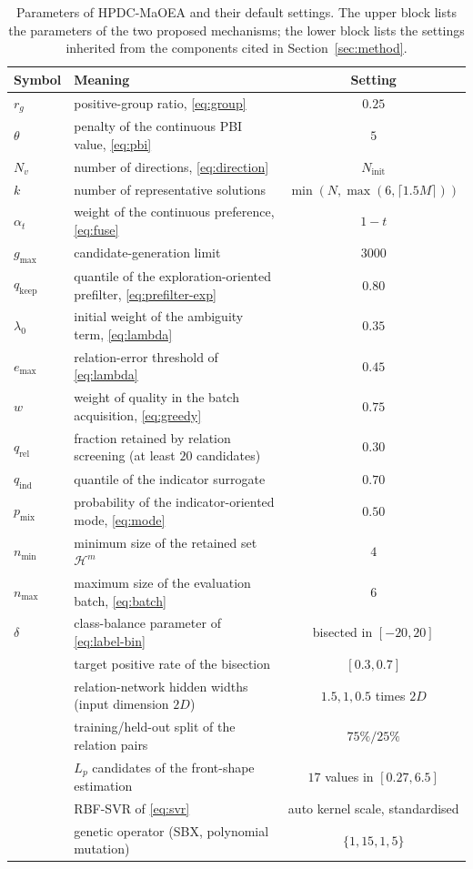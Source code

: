 \documentclass[final,5p,times,twocolumn]{elsarticle}
\begin{document}
\begin{table}[t]
\centering
\caption{Parameters of HPDC-MaOEA and their default settings. The upper block
lists the parameters of the two proposed mechanisms; the lower block lists the
settings inherited from the components cited in
Section~\ref{sec:method}.}
\label{tab:params}
\small
\begin{tabular}{llc}
\toprule
Symbol & Meaning & Setting \\
\midrule
$r_g$ & positive-group ratio, \eqref{eq:group} & $0.25$ \\
$\theta$ & penalty of the continuous PBI value, \eqref{eq:pbi} & $5$ \\
$N_v$ & number of directions, \eqref{eq:direction} & $N_{\mathrm{init}}$ \\
$k$ & number of representative solutions & $\min(N,\max(6,\lceil1.5M\rceil))$ \\
$\alpha_t$ & weight of the continuous preference, \eqref{eq:fuse} & $1-t$ \\
$g_{\max}$ & candidate-generation limit & $3000$ \\
$q_{\mathrm{keep}}$ & quantile of the exploration-oriented prefilter,
  \eqref{eq:prefilter-exp} & $0.80$ \\
$\lambda_0$ & initial weight of the ambiguity term, \eqref{eq:lambda} & $0.35$ \\
$e_{\max}$ & relation-error threshold of \eqref{eq:lambda} & $0.45$ \\
$w$ & weight of quality in the batch acquisition, \eqref{eq:greedy} & $0.75$ \\
$q_{\mathrm{rel}}$ & fraction retained by relation screening
  (at least $20$ candidates) & $0.30$ \\
$q_{\mathrm{ind}}$ & quantile of the indicator surrogate & $0.70$ \\
$p_{\mathrm{mix}}$ & probability of the indicator-oriented mode,
  \eqref{eq:mode} & $0.50$ \\
$n_{\min}$ & minimum size of the retained set $\mathcal{H}^{m}$ & $4$ \\
$n_{\max}$ & maximum size of the evaluation batch, \eqref{eq:batch} & $6$ \\
\midrule
$\delta$ & class-balance parameter of \eqref{eq:label-bin} &
  bisected in $[-20,20]$ \\
 & target positive rate of the bisection & $[0.3,0.7]$ \\
 & relation-network hidden widths (input dimension $2D$) &
  $1.5,1,0.5$ times $2D$ \\
 & training/held-out split of the relation pairs & $75\%/25\%$ \\
 & $L_p$ candidates of the front-shape estimation~\cite{ref:piea} &
  $17$ values in $[0.27,6.5]$ \\
 & RBF-SVR of \eqref{eq:svr} & auto kernel scale, standardised \\
 & genetic operator (SBX, polynomial mutation) & $\{1,15,1,5\}$ \\
\bottomrule
\end{tabular}
\end{table}
\end{document}
